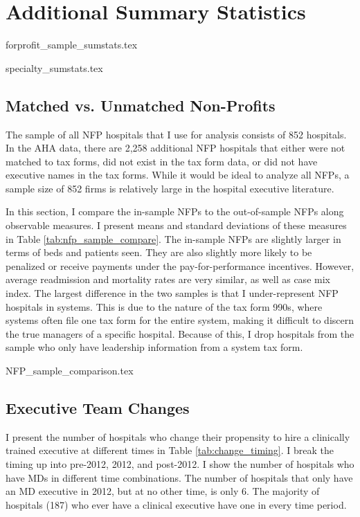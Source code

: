 \documentclass[12pt]{article}
\begin{document}
\section{Additional Summary Statistics}\label{app:sumstats}

{forprofit_sample_sumstats.tex}

{specialty_sumstats.tex}

\subsection{Matched vs. Unmatched Non-Profits}\label{app:matched}

The sample of all NFP hospitals that I use for analysis consists of 852 hospitals. In the AHA data, there are 2,258 additional NFP hospitals that either were not matched to tax forms, did not exist in the tax form data, or did not have executive names in the tax forms. While it would be ideal to analyze all NFPs, a sample size of 852 firms is relatively large in the hospital executive literature. 

In this section, I compare the in-sample NFPs to the out-of-sample NFPs along observable measures. I present means and standard deviations of these measures in Table \ref{tab:nfp_sample_compare}. The in-sample NFPs are slightly larger in terms of beds and patients seen. They are also slightly more likely to be penalized or receive payments under the pay-for-performance incentives. However, average readmission and mortality rates are very similar, as well as case mix index. The largest difference in the two samples is that I under-represent NFP hospitals in systems. This is due to the nature of the tax form 990s, where systems often file one tax form for the entire system, making it difficult to discern the true managers of a specific hospital. Because of this, I drop hospitals from the sample who only have leadership information from a system tax form. 

{NFP_sample_comparison.tex}

\subsection{Executive Team Changes}\label{app:changes}

I present the number of hospitals who change their propensity to hire a clinically trained executive at different times in Table \ref{tab:change_timing}. I break the timing up into pre-2012, 2012, and post-2012. I show the number of hospitals who have MDs in different time combinations. The number of hospitals that only have an MD executive in 2012, but at no other time, is only 6. The majority of hospitals (187) who ever have a clinical executive have one in every time period. 
\end{document}

